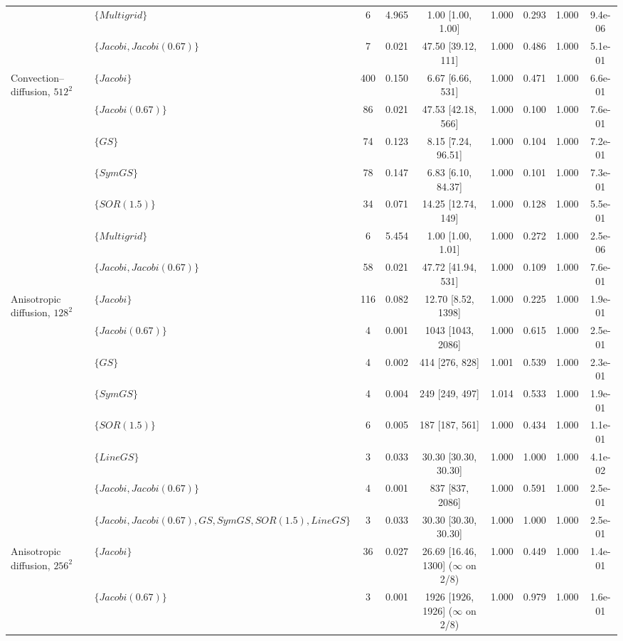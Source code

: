 {\begin{tabular}{llccccccc}
 & $\{Multigrid\}$ & 6 & 4.965 & 1.00 [1.00, 1.00] & 1.000 & 0.293 & 1.000 & 9.4e-06 \\
 & $\{Jacobi, Jacobi (0.67)\}$ & 7 & 0.021 & 47.50 [39.12, 111] & 1.000 & 0.486 & 1.000 & 5.1e-01 \\
\midrule
Convection--diffusion, $512^2$ & $\{Jacobi\}$ & 400 & 0.150 & 6.67 [6.66, 531] & 1.000 & 0.471 & 1.000 & 6.6e-01 \\
 & $\{Jacobi (0.67)\}$ & 86 & 0.021 & 47.53 [42.18, 566] & 1.000 & 0.100 & 1.000 & 7.6e-01 \\
 & $\{GS\}$ & 74 & 0.123 & 8.15 [7.24, 96.51] & 1.000 & 0.104 & 1.000 & 7.2e-01 \\
 & $\{SymGS\}$ & 78 & 0.147 & 6.83 [6.10, 84.37] & 1.000 & 0.101 & 1.000 & 7.3e-01 \\
 & $\{SOR (1.5)\}$ & 34 & 0.071 & 14.25 [12.74, 149] & 1.000 & 0.128 & 1.000 & 5.5e-01 \\
 & $\{Multigrid\}$ & 6 & 5.454 & 1.00 [1.00, 1.01] & 1.000 & 0.272 & 1.000 & 2.5e-06 \\
 & $\{Jacobi, Jacobi (0.67)\}$ & 58 & 0.021 & 47.72 [41.94, 531] & 1.000 & 0.109 & 1.000 & 7.6e-01 \\
\midrule
Anisotropic diffusion, $128^2$ & $\{Jacobi\}$ & 116 & 0.082 & 12.70 [8.52, 1398] & 1.000 & 0.225 & 1.000 & 1.9e-01 \\
 & $\{Jacobi (0.67)\}$ & 4 & 0.001 & 1043 [1043, 2086] & 1.000 & 0.615 & 1.000 & 2.5e-01 \\
 & $\{GS\}$ & 4 & 0.002 & 414 [276, 828] & 1.001 & 0.539 & 1.000 & 2.3e-01 \\
 & $\{SymGS\}$ & 4 & 0.004 & 249 [249, 497] & 1.014 & 0.533 & 1.000 & 1.9e-01 \\
 & $\{SOR (1.5)\}$ & 6 & 0.005 & 187 [187, 561] & 1.000 & 0.434 & 1.000 & 1.1e-01 \\
 & $\{Line GS\}$ & 3 & 0.033 & 30.30 [30.30, 30.30] & 1.000 & 1.000 & 1.000 & 4.1e-02 \\
 & $\{Jacobi, Jacobi (0.67)\}$ & 4 & 0.001 & 837 [837, 2086] & 1.000 & 0.591 & 1.000 & 2.5e-01 \\
 & $\{Jacobi, Jacobi (0.67), GS, SymGS, SOR (1.5), Line GS\}$ & 3 & 0.033 & 30.30 [30.30, 30.30] & 1.000 & 1.000 & 1.000 & 2.5e-01 \\
\midrule
Anisotropic diffusion, $256^2$ & $\{Jacobi\}$ & 36 & 0.027 & 26.69 [16.46, 1300] ($\infty$ on 2/8) & 1.000 & 0.449 & 1.000 & 1.4e-01 \\
 & $\{Jacobi (0.67)\}$ & 3 & 0.001 & 1926 [1926, 1926] ($\infty$ on 2/8) & 1.000 & 0.979 & 1.000 & 1.6e-01 \\

\end{tabular}}
